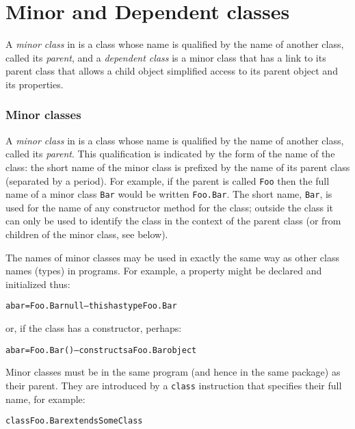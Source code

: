 \chapter{Minor and Dependent classes}\label{refminor}
 
A \emph{minor class} in \nr{} is a class whose name is qualified by
the name of another class, called its \emph{parent}, and a
\emph{dependent class} is a minor class that has a link to its parent
class that allows a child object simplified access to its parent
object and its properties.
\subsection{Minor classes}\label{refsminorc}
\index{,}
\index{,}
\index{,}
\index{,}
 
A \emph{minor class} in \nr{} is a class whose name is qualified by
the name of another class, called its \emph{parent}.
This qualification is indicated by the form of the name of the class:
the short name of the minor class is prefixed by the name of its parent
class (separated by a period).
For example, if the parent is called \texttt{Foo} then the full name of a
minor class \texttt{Bar} would be written \texttt{Foo.Bar}.
The short name, \texttt{Bar}, is used for the name of any constructor
method for the class; outside the class it can only be used to identify
the class in the context of the parent class (or from children of the
minor class, see below).
 
The names of minor classes may be used in exactly the same way as
other class names (types) in programs.  For example, a property might be
declared and initialized thus:
\begin{alltt}
abar=Foo.Bar null   -- this has type Foo.Bar
\end{alltt}
or, if the class has a constructor, perhaps:
\begin{alltt}
abar=Foo.Bar()      -- constructs a Foo.Bar object
\end{alltt}
 
Minor classes must be in the same program (and hence in the same
package) as their parent.  They are introduced by a \texttt{class}
instruction that specifies their full name, for example:
\begin{alltt}
class Foo.Bar extends SomeClass
\end{alltt}
 
